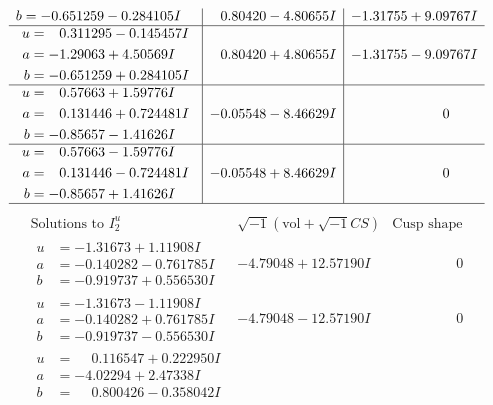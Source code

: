 \documentclass[1p]{elsarticle_modified}
\theoremstyle{definition}
\newcommand{\I}{\sqrt{-1}}
\begin{document}
$$\begin{array}{c|c|c}
\begin{aligned}
b &= -0.651259 - 0.284105 I\end{aligned}
 & \phantom{-}0.80420 - 4.80655 I & -1.31755 + 9.09767 I \\ \hline\begin{aligned}
u &= \phantom{-}0.311295 - 0.145457 I \\
a &= -1.29063 + 4.50569 I \\
b &= -0.651259 + 0.284105 I\end{aligned}
 & \phantom{-}0.80420 + 4.80655 I & -1.31755 - 9.09767 I \\ \hline\begin{aligned}
u &= \phantom{-}0.57663 + 1.59776 I \\
a &= \phantom{-}0.131446 + 0.724481 I \\
b &= -0.85657 - 1.41626 I\end{aligned}
 & -0.05548 - 8.46629 I & \phantom{-0.000000 } 0 \\ \hline\begin{aligned}
u &= \phantom{-}0.57663 - 1.59776 I \\
a &= \phantom{-}0.131446 - 0.724481 I \\
b &= -0.85657 + 1.41626 I\end{aligned}
 & -0.05548 + 8.46629 I & \phantom{-0.000000 } 0\\
 \hline 
 \end{array}$$\newpage$$\begin{array}{c|c|c}  
\text{Solutions to }I^u_{2}& \I (\text{vol} + \sqrt{-1}CS) & \text{Cusp shape}\\
 \hline 
\begin{aligned}
u &= -1.31673 + 1.11908 I \\
a &= -0.140282 - 0.761785 I \\
b &= -0.919737 + 0.556530 I\end{aligned}
 & -4.79048 + 12.57190 I & \phantom{-0.000000 } 0 \\ \hline\begin{aligned}
u &= -1.31673 - 1.11908 I \\
a &= -0.140282 + 0.761785 I \\
b &= -0.919737 - 0.556530 I\end{aligned}
 & -4.79048 - 12.57190 I & \phantom{-0.000000 } 0 \\ \hline\begin{aligned}
u &= \phantom{-}0.116547 + 0.222950 I \\
a &= -4.02294 + 2.47338 I \\
b &= \phantom{-}0.800426 - 0.358042 I\end{aligned}

\end{array}$$
\end{document}
